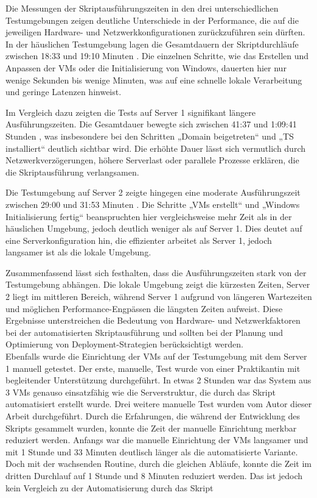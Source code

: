 \documentclass[a4paper,12pt]{article}
\begin{document}
Die Messungen der Skriptausführungszeiten in den drei unterschiedlichen Testumgebungen zeigen deutliche Unterschiede in der Performance, die auf die jeweiligen Hardware- und Netzwerkkonfigurationen zurückzuführen sein dürften. 
In der häuslichen Testumgebung lagen die Gesamtdauern der Skriptdurchläufe zwischen 18:33 und 19:10 Minuten \citep{tab:server_times}. 
Die einzelnen Schritte, wie das Erstellen und Anpassen der VMs oder die Initialisierung von Windows, dauerten hier nur wenige Sekunden bis wenige Minuten, was auf eine schnelle lokale Verarbeitung und geringe Latenzen hinweist.

Im Vergleich dazu zeigten die Tests auf Server 1 signifikant längere Ausführungszeiten. 
Die Gesamtdauer bewegte sich zwischen 41:37 und 1:09:41 Stunden \citep{tab:server_times1}, was insbesondere bei den Schritten „Domain beigetreten“ und „TS installiert“ deutlich sichtbar wird. 
Die erhöhte Dauer lässt sich vermutlich durch Netzwerkverzögerungen, höhere Serverlast oder parallele Prozesse erklären, die die Skriptausführung verlangsamen.

Die Testumgebung auf Server 2 zeigte hingegen eine moderate Ausführungszeit zwischen 29:00 und 31:53 Minuten \citep{tab:server_times2}. 
Die Schritte „VMs erstellt“ und „Windows Initialisierung fertig“ beanspruchten hier vergleichsweise mehr Zeit als in der häuslichen Umgebung, jedoch deutlich weniger als auf Server 1. 
Dies deutet auf eine Serverkonfiguration hin, die effizienter arbeitet als Server 1, jedoch langsamer ist als die lokale Umgebung.

Zusammenfassend lässt sich festhalten, dass die Ausführungszeiten stark von der Testumgebung abhängen. 
Die lokale Umgebung zeigt die kürzesten Zeiten, Server 2 liegt im mittleren Bereich, während Server 1 aufgrund von längeren Wartezeiten und möglichen Performance-Engpässen die längsten Zeiten aufweist. 
Diese Ergebnisse unterstreichen die Bedeutung von Hardware- und Netzwerkfaktoren bei der automatisierten Skriptausführung und sollten bei der Planung und Optimierung von Deployment-Strategien berücksichtigt werden.\\

Ebenfalls wurde die Einrichtung der VMs auf der Testumgebung mit dem Server 1 manuell getestet. Der erste, manuelle, Test wurde von einer Praktikantin mit begleitender Unterstützung durchgeführt.
In etwas 2 Stunden war das System aus 3 VMs genauso einsatzfähig wie die Serverstruktur, die durch das Skript automatisiert erstellt wurde. Drei weitere manuelle Test wurden vom Autor dieser Arbeit durchgeführt.
Durch die Erfahrungen, die während der Entwicklung des Skripts gesammelt wurden, konnte die Zeit der manuelle Einrichtung merkbar reduziert werden.
Anfangs war die manuelle Einrichtung der VMs langsamer und mit 1 Stunde und 33 Minuten deutlisch länger als die automatisierte Variante.
Doch mit der wachsenden Routine, durch die gleichen Abläufe, konnte die Zeit im dritten Durchlauf auf 1 Stunde und 8 Minuten reduziert werden.
Das ist jedoch kein Vergleich zu der Automatisierung durch das Skript\\
\end{document}
